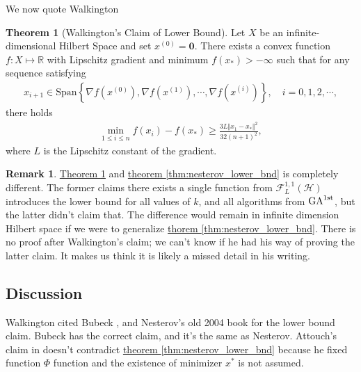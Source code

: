 \documentclass[]{article}
\theoremstyle{definition}
\newtheorem{theorem}{Theorem}[subsection]       %
\newtheorem{remark}{Remark}[subsection]
{
    \newtheorem{assumption}{Assumption}
}
\numberwithin{equation}{subsection}
\begin{document}
        We now quote Walkington \cite[theorem 2.4]{noel_nesterovs_nodate}
        \begin{theorem}[Walkington's Claim of Lower Bound]\label{thm:walkington_lowerbound}
            Let $X$ be an infinite-dimensional Hilbert Space and set $x^{(0)} =\mathbf 0$. There exists a convex function $f: X\mapsto \mathbb R$ with Lipschitz gradient and minimum $f(x_*) > -\infty$ such that for any sequence satisfying 
            \begin{align*}
                x_{i + 1}\in \text{Span}\left\lbrace
                    \nabla f(x^{(0)}), \nabla f(x^{(1)}), \cdots, \nabla f(x^{(i)})
                \right\rbrace, 
                \quad i = 0, 1, 2, \cdots, 
            \end{align*}
            there holds 
            \begin{align*}
                \min_{1\le i \le n}
                f(x_i) - f(x_*) \ge 
                \frac{3L\Vert x_1 - x_*\Vert^2}{32(n + 1)^2}, 
            \end{align*}
            where $L$ is the Lipschitz constant of the gradient. 
        \end{theorem}
        \begin{remark}
            \hyperref[thm:walkington_lowerbound]{Theorem \ref*{thm:walkington_lowerbound}} and 
            \hyperref[thm:nesterov_lower_bnd]{theorem \ref*{thm:nesterov_lower_bnd}} is completely different. 
            The former claims there exists a single function from $\mathcal F_{L}^{1,1}(\mathcal H)$ introduces the lower bound for all values of $k$, and all algorithms from $\text{GA}^{\text{1st}}$, but the latter didn't claim that. 
            The difference would remain in infinite dimension Hilbert space if we were to generalize \hyperref[thm:nesterov_lower_bnd]{thorem \ref*{thm:nesterov_lower_bnd}}. 
            There is no proof after Walkington's claim; we can't know if he had his way of proving the latter claim. 
            It makes us think it is likely a missed detail in his writing. 
        \end{remark}
    \subsection{Discussion}
        Walkington cited Bubeck \cite[thm 3.14]{bubeck_convex_2015}, and Nesterov's old 2004 book\cite{nesterov_introductory_2004} for the lower bound claim. 
        Bubeck has the correct claim, and it's the same as Nesterov. 
        Attouch's claim in \cite[thm 1]{attouch_rate_2016} doesn't contradict \hyperref[thm:nesterov_lower_bnd]{theorem \ref*{thm:nesterov_lower_bnd}} because he fixed function $\Phi$ function and the existence of minimizer $x^*$ is not assumed. 
        
\end{document}
